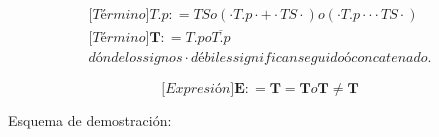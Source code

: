 \documentclass[
]{article}
\begin{document}
\begin{enumerate}
\begin{enumerate}
\begin{enumerate}
\begin{enumerate}
        \[\begin{matrix}
        {{\lbrack\mathbf{\mathit{Término}}\rbrack}\mathbf{\mathit{T.p}}{: =}\mathbf{\mathit{TS}}o\left( {{{{\cdot \mathbf{\mathit{T.p}}} \cdot \mathbf{+}} \cdot \mathbf{\mathit{TS}}} \cdot} \right)o\left( {{{{\cdot \mathbf{\mathit{T.p}}} \cdot \mathbf{\mathrm{\cdot}}} \cdot \mathbf{\mathit{TS}}} \cdot} \right)} \\
        {{\lbrack\mathbf{\mathit{Término}}\rbrack}\mathbf{T}{: =}\mathbf{\mathit{T.p}}o\overline{\mathbf{\mathit{T.p}}}} \\
        {\mathit{dónde}\mathit{los}\mathit{signos} \cdot \mathit{débiles}\mathit{significan}\mathit{seguido}ó\mathit{concatenado.}}
        \end{matrix}\]

        \[{\lbrack\mathbf{\mathit{Expresión}}\rbrack}\mathbf{E}{: =}\mathbf{T{=}T}o\mathbf{T{\neq}T}\]

        Esquema de demostración:


\end{enumerate}
\end{enumerate}
\end{enumerate}
\end{enumerate}
\end{document}
